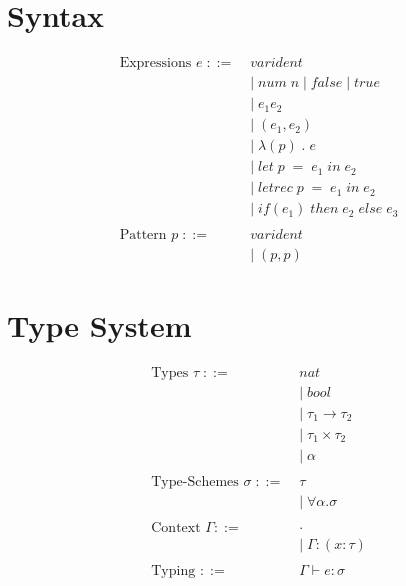 \documentclass[10pt,a4paper,draft]{article}
\begin{document}
\begin{flushleft}
\section{Syntax}

\begin{align*}
\text{Expressions }e \; ::= \; &varident  \\
&| \; num \; n \; | \; false \; | \; true \\
&|\;e_{1}e_{2} \\
&|\;(e_{1},e_{2}) \\
&|\;\lambda(p)\;.\;e \\
&|\;let \; p \; = \; e_{1} \; in \; e_{2} \\
&|\;letrec \; p \; = \; e_{1} \; in \; e_{2} \\
&|\; if(e_{1}) \; then \; e_{2} \; else \; e_{3}\\
\\
\text{Pattern }p \; ::= \; &varident \\
&| \; (p,p)
\end{align*}

\section{Type System}

\begin{align*}
\text{Types }\tau \; ::= \; &nat \\
&| \; bool \\
&| \; \tau_{1} \rightarrow \tau_{2} \\
&| \; \tau_{1} \times \tau_{2} \\
&| \; \alpha \\
\\
\text{Type-Schemes } \sigma \; ::= \; &\tau \\
&| \; \forall \alpha . \sigma \\
\\
\text{Context }\Gamma ::=\; &\cdot \\
&| \; \Gamma :(x:\tau) \\
\\
\text{Typing } ::=\;&\Gamma \vdash e: \sigma \\
\end{align*}


\end{flushleft}
\end{document}
